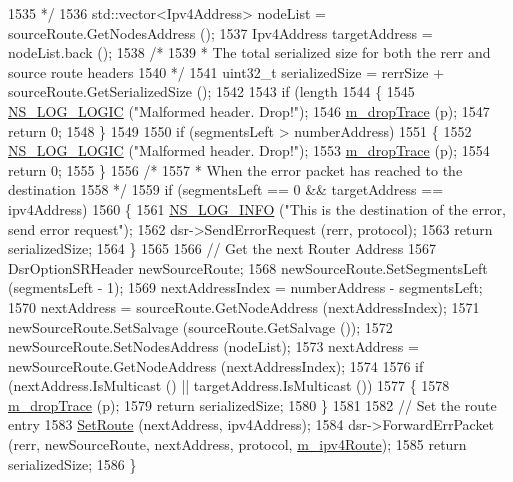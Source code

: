 \begin{DoxyCode}
1535 \textcolor{comment}{   */}
1536   std::vector<Ipv4Address> nodeList = sourceRoute.GetNodesAddress ();
1537   Ipv4Address targetAddress = nodeList.back ();
1538   \textcolor{comment}{/*}
1539 \textcolor{comment}{   * The total serialized size for both the rerr and source route headers}
1540 \textcolor{comment}{   */}
1541   uint32\_t serializedSize = rerrSize + sourceRoute.GetSerializedSize ();
1542 
1543   \textcolor{keywordflow}{if} (length %
1544     \{
1545       \hyperlink{group__logging_ga88acd260151caf2db9c0fc84997f45ce}{NS\_LOG\_LOGIC} (\textcolor{stringliteral}{"Malformed header. Drop!"});
1546       \hyperlink{classns3_1_1dsr_1_1DsrOptions_a176bbc9efb58b6d750c14b9b03c525c4}{m\_dropTrace} (p);
1547       \textcolor{keywordflow}{return} 0;
1548     \}
1549 
1550   \textcolor{keywordflow}{if} (segmentsLeft > numberAddress)
1551     \{
1552       \hyperlink{group__logging_ga88acd260151caf2db9c0fc84997f45ce}{NS\_LOG\_LOGIC} (\textcolor{stringliteral}{"Malformed header. Drop!"});
1553       \hyperlink{classns3_1_1dsr_1_1DsrOptions_a176bbc9efb58b6d750c14b9b03c525c4}{m\_dropTrace} (p);
1554       \textcolor{keywordflow}{return} 0;
1555     \}
1556   \textcolor{comment}{/*}
1557 \textcolor{comment}{   * When the error packet has reached to the destination}
1558 \textcolor{comment}{   */}
1559   \textcolor{keywordflow}{if} (segmentsLeft == 0 && targetAddress == ipv4Address)
1560     \{
1561       \hyperlink{group__logging_gafbd73ee2cf9f26b319f49086d8e860fb}{NS\_LOG\_INFO} (\textcolor{stringliteral}{"This is the destination of the error, send error request"});
1562       dsr->SendErrorRequest (rerr, protocol);
1563       \textcolor{keywordflow}{return} serializedSize;
1564     \}
1565 
1566   \textcolor{comment}{// Get the next Router Address}
1567   DsrOptionSRHeader newSourceRoute;
1568   newSourceRoute.SetSegmentsLeft (segmentsLeft - 1);
1569   nextAddressIndex = numberAddress - segmentsLeft;
1570   nextAddress = sourceRoute.GetNodeAddress (nextAddressIndex);
1571   newSourceRoute.SetSalvage (sourceRoute.GetSalvage ());
1572   newSourceRoute.SetNodesAddress (nodeList);
1573   nextAddress = newSourceRoute.GetNodeAddress (nextAddressIndex);
1574 
1576   \textcolor{keywordflow}{if} (nextAddress.IsMulticast () || targetAddress.IsMulticast ())
1577     \{
1578       \hyperlink{classns3_1_1dsr_1_1DsrOptions_a176bbc9efb58b6d750c14b9b03c525c4}{m\_dropTrace} (p);
1579       \textcolor{keywordflow}{return} serializedSize;
1580     \}
1581 
1582   \textcolor{comment}{// Set the route entry}
1583   \hyperlink{classns3_1_1dsr_1_1DsrOptions_af749b76db4626ae64bc37001a5353b99}{SetRoute} (nextAddress, ipv4Address);
1584   dsr->ForwardErrPacket (rerr, newSourceRoute, nextAddress, protocol, 
      \hyperlink{classns3_1_1dsr_1_1DsrOptions_ae4785209eae1d101cb8bd2d3b392d2ad}{m\_ipv4Route});
1585   \textcolor{keywordflow}{return} serializedSize;
1586 \}
\end{DoxyCode}


